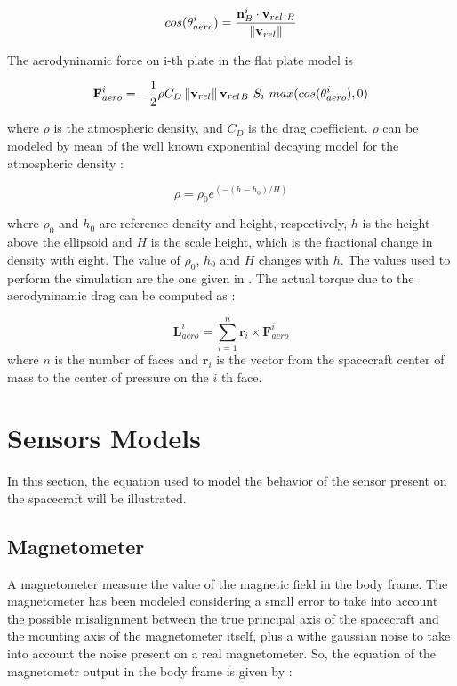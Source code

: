 \documentclass[11pt,a4paper]{report}
\begin{document}
\begin{equation}
 cos(\theta_{aero}^{i}) = \frac{\mathbf{n}_{B}^{i} \cdot \mathbf{v}_{rel\ B}}{\norm{\mathbf{v}_{rel}}}
\end{equation}

The aerodyninamic force on i-th plate in the flat plate model is

\begin{equation}
 \mathbf{F}_{aero}^{i} = - \frac{1}{2} \rho C_{D} \norm{\mathbf{v}_{rel}} \mathbf{v}_{rel_{} B}\ S_{i}\ max(cos(\theta_{aero}^{i}),0)
\end{equation}

where $\rho$ is the atmospheric density, and $C_D$ is the drag coefficient.  
$\rho$ can be modeled by mean of the well known exponential decaying model for the atmospheric density :

\begin{equation}
 \rho = \rho_{0} e^{(-(h-h_{0})/H)}
\end{equation}

where $\rho_{0}$ and $h_{0}$ are reference density and height, respectively, $h$ is the height above the ellipsoid and $H$ is the scale height, which is the fractional change in density with eight.
The value of $\rho_{0}$, $h_{0}$  and $H$ changes with $h$. 
The values used to perform the simulation are the one given in \cite{Ref:Books:Fundamentals}.
The actual torque due to the aerodyninamic drag can be computed as : 

\begin{equation}
 \mathbf{L}_{aero}^{i} = \sum\limits_{i=1}^n  \mathbf{r}_{i} \times \mathbf{F}_{aero}^{i}
\end{equation}
where $n$ is the number of faces and $\mathbf{r}_{i}$ is the vector from the spacecraft center of mass to the center of pressure on the $i$ th face.\\

\section{Sensors Models}
In this section, the equation used to model the behavior of the sensor present on the spacecraft will be illustrated.
\subsection{Magnetometer}
A magnetometer measure the value of the magnetic field in the body frame.
The magnetometer has been modeled considering a small error to take into account the possible misalignment between the true principal axis of the spacecraft and the mounting axis of the magnetometer itself, plus a withe gaussian noise to take into account the noise present on a real magnetometer.
So, the equation of the magnetometr output in the body frame is given by : 
\end{document}
